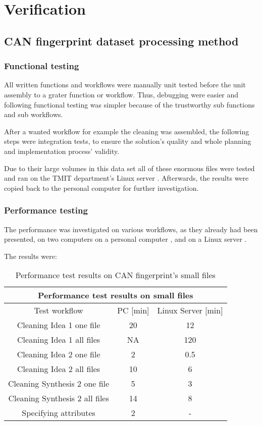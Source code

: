 \chapter{Verification}
\section{CAN fingerprint dataset processing method}
\subsection{Functional testing}
All written functions and workflows were manually unit tested before the unit assembly to a grater function or workflow. Thus, debugging were easier and following functional testing was simpler because of the trustworthy sub functions and sub workflows.

After a wanted workflow for example the cleaning was assembled, the following steps were integration tests, to ensure the solution's quality and whole planning and implementation process' validity.

Due to their large volumes in this data set all of these enormous files were tested and ran on the TMIT department's Linux server \cite{Batman}.
Afterwards, the results were copied back to the personal computer for further investigation.
\subsection{Performance testing}
The performance was investigated on various workflows, as they already had been presented, on two computers on a personal computer \cite{Latitude}, and on a Linux server \cite{Batman}.

The results were:
\begin{table}[H]
\centering
\begin{tabular}{ |c|c|c|  }
\hline
\multicolumn{3}{|c|}{Performance test results on small files} \\
\hline
Test workflow& PC [min] & Linux Server [min]\\
\hline
Cleaning Idea 1 one file& 20 & 12 \\
Cleaning Idea 1 all files& NA & 120 \\
Cleaning Idea 2 one file& 2 & 0.5 \\
Cleaning Idea 2 all files& 10 & 6 \\
Cleaning Synthesis 2 one file& 5 & 3 \\
Cleaning Synthesis 2 all files& 14 & 8 \\
Specifying attributes & 2 & - \\
\hline
\end{tabular}
\caption{Performance test results on CAN fingerprint's small files}
\label{table:1}
\end{table}


